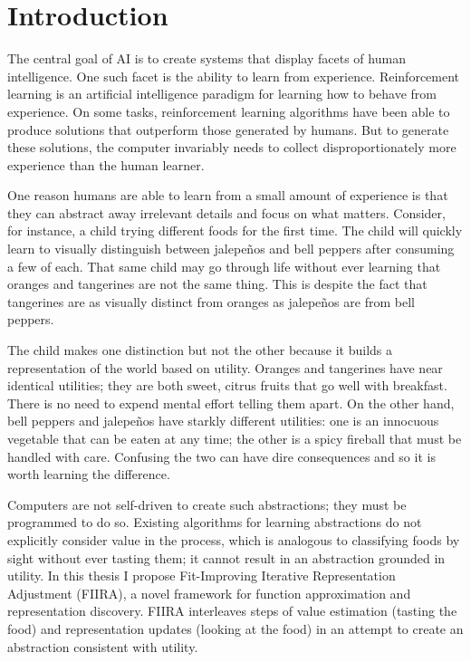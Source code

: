 \chapter{Introduction}
The central goal of AI is to create systems that
display facets of human intelligence.
One such facet is the ability to learn from experience.
Reinforcement learning is an artificial intelligence paradigm for learning
how to behave from experience.
On some tasks, reinforcement learning algorithms have been able to produce
solutions that outperform those generated by humans.
But to generate these solutions, the computer invariably needs to collect
disproportionately more experience than the human learner.

One reason humans are able to learn from a small amount of experience is
that they can abstract away irrelevant details and focus on what matters.
Consider, for instance, a child trying different foods for the first time.
The child will quickly learn to visually distinguish between jalepe\~{n}os and
bell peppers after consuming a few of each.
That same child may go through life without ever learning that oranges and
tangerines are not the same thing.
This is despite the fact that tangerines are as visually distinct
from oranges as jalepe\~{n}os are from bell peppers.

The child makes one distinction but not the other because it
builds a representation of the world based on utility.
Oranges and tangerines have near identical utilities;
they are both sweet, citrus fruits that go well with breakfast.
There is no need to expend mental effort telling them apart.
On the other hand, bell peppers and jalepe\~{n}os have starkly different
utilities:
one is an innocuous vegetable that can be eaten at any time; the other
is a spicy fireball that must be handled with care.
Confusing the two can have dire consequences and so it is worth
learning the difference.

Computers are not self-driven to create such abstractions;
they must be programmed to do so.
Existing algorithms for learning abstractions do not explicitly
consider value in the process, which is analogous to classifying foods
by sight without ever tasting them;
it cannot result in an abstraction grounded in utility.
In this thesis I propose Fit-Improving Iterative Representation Adjustment
(FIIRA), a novel framework for function approximation and representation
discovery. FIIRA interleaves steps of value estimation (tasting the food) and
representation updates (looking at the food) in an attempt to create an
abstraction consistent with utility.


